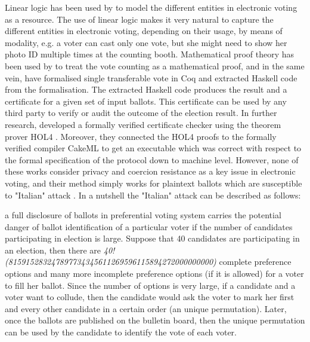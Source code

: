  \noindent
 Linear logic \citep{GIRARD19871} has been used by \citep{DeYoung:2012:LLV} to model the different entities in electronic voting as a resource. 
 The use of linear logic makes it very natural to capture the different entities in electronic voting,  
 depending on their usage, by means of modality, e.g.  a voter can cast only one vote, but she might 
 need to show her photo ID multiple times at the counting booth. Mathematical proof theory has 
 been used by \citep{Pattinson:2015:VCM}  to treat the vote counting as a mathematical 
 proof, and in the same vein, 
 \citep{Ghale:2017:FVS} have formalised single transferable vote in Coq and 
 extracted Haskell code from the formalisation. The extracted Haskell code produces the result 
 and a certificate for a given set of input ballots. This certificate can be used by any third party to verify 
 or audit the outcome of the election result.  In further research, \citep{10.1007/978-3-030-03592-1_5} 
 developed a formally verified certificate checker using the theorem prover HOL4 \citep{Slind:2008:BOH:1459784.1459792}. 
 Moreover, they connected the HOL4 proofs to the formally verified compiler CakeML \citep{Kumar:2014:CVI} 
 to get an executable which was correct with respect to the formal specification of the protocol
 down to machine level. 
 However, none of these works consider privacy and coercion resistance as a key 
 issue in electronic voting, and their method simply works for plaintext ballots which are  susceptible to 
 "Italian" attack  \citep{Otten}   \citep{Benaloh:2009:SSC}.  In a nutshell the "Italian" attack can be described 
 as follows: 
 \begin{displayquote}
 \label{firstchap:italian}
 a full disclosure of 
 ballots in preferential voting system carries the potential danger of  ballot identification of 
 a particular voter if the number of candidates participating in election is large. Suppose
 that 40 candidates are participating in an election, then there are \textit{40!
 (815915283247897734345611269596115894272000000000)} complete 
 preference options and many more incomplete  preference options  (if it is allowed) for a voter to 
 fill her ballot. Since the number of options is very large, if a candidate and a voter want 
 to collude, then the candidate would ask the voter to mark her first and every other candidate 
 in a certain order (an unique permutation). Later, once the ballots are published 
 on the bulletin board, then the unique permutation can be used by the candidate to 
 identify the vote of each voter.  
 \end{displayquote}
 

